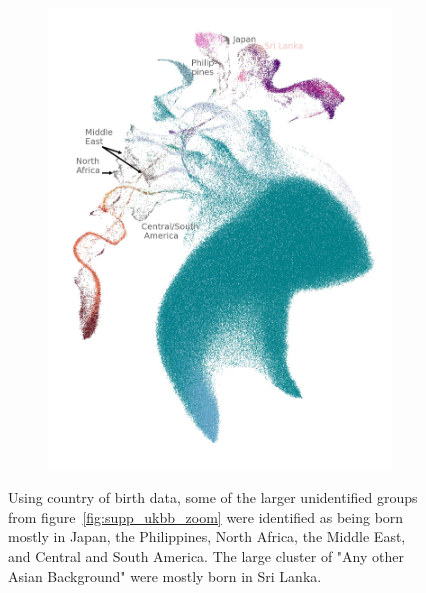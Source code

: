 \documentclass[12pt]{pnas-new}
\begin{document}
\begin{figure}
    \centering
    \begin{subfigure}{0.8\textwidth}
    \includegraphics[width=\textwidth]{images/UKBB_UMAP_PC10_NN15_MD05_eth_cob_resized.jpeg}
    \end{subfigure}
    \caption{Using country of birth data, some of the larger unidentified groups from figure~\ref{fig:supp_ukbb_zoom} were identified as being born mostly in Japan, the Philippines, North Africa, the Middle East, and Central and South America. The large cluster of "Any other Asian Background" were mostly born in Sri Lanka.}
    \label{fig:supp_ukbb_cob}
\end{figure}
\end{document}
